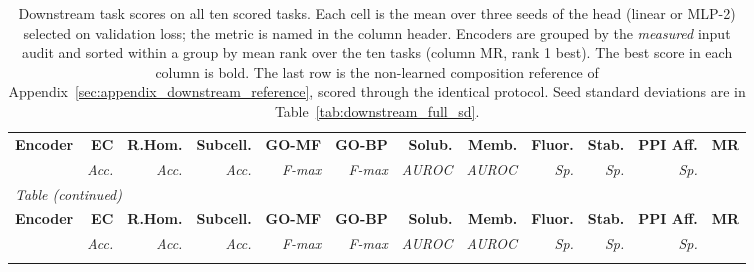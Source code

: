 \begingroup
\fontsize{7}{8.6}\selectfont
\setlength{\tabcolsep}{2pt}
\renewcommand{\arraystretch}{1.08}
\begin{longtable}{lrrrrrrrrrrr}
\caption{Downstream task scores on all ten scored tasks. Each cell is the mean over three seeds of the head (linear
or MLP-2) selected on validation loss; the metric is named in the column header.
Encoders are grouped by the \emph{measured} input audit and sorted within a group by
mean rank over the ten tasks (column MR, rank 1 best). The best score in each column is bold. The last row is the
non-learned composition reference of Appendix~\ref{sec:appendix_downstream_reference}, scored through the identical protocol.
Seed standard deviations are in Table~\ref{tab:downstream_full_sd}.}\label{tab:downstream_full}\\
\toprule
\rowcolor{CompassLavender!32}
\textbf{Encoder} & \textbf{EC} & \textbf{R.Hom.} & \textbf{Subcell.} & \textbf{GO-MF} & \textbf{GO-BP} & \textbf{Solub.} & \textbf{Memb.} & \textbf{Fluor.} & \textbf{Stab.} & \textbf{PPI Aff.} & \textbf{MR} \\
 & \textit{Acc.} & \textit{Acc.} & \textit{Acc.} & \textit{F-max} & \textit{F-max} & \textit{AUROC} & \textit{AUROC} & \textit{Sp.} & \textit{Sp.} & \textit{Sp.} & \\

\midrule
\endfirsthead
\multicolumn{12}{l}{\small\textit{Table \thetable{} (continued)}}\\
\toprule
\rowcolor{CompassLavender!32}
\textbf{Encoder} & \textbf{EC} & \textbf{R.Hom.} & \textbf{Subcell.} & \textbf{GO-MF} & \textbf{GO-BP} & \textbf{Solub.} & \textbf{Memb.} & \textbf{Fluor.} & \textbf{Stab.} & \textbf{PPI Aff.} & \textbf{MR} \\
 & \textit{Acc.} & \textit{Acc.} & \textit{Acc.} & \textit{F-max} & \textit{F-max} & \textit{AUROC} & \textit{AUROC} & \textit{Sp.} & \textit{Sp.} & \textit{Sp.} & \\

\midrule
\endhead
\midrule
\endfoot
\bottomrule
\endlastfoot


\end{longtable}
